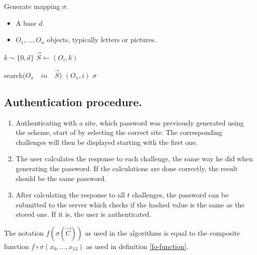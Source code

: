 \begin{algorithm}
    \caption{Generate mapping $\sigma$.}
    \begin{algorithmic}[1]
        \Require
            \Statex \begin{itemize}
                \item A base $d$.
                \item $O_1,\dots,O_n$ objects, typically letters or pictures.
            \end{itemize}
        
            \State $k \sim \{0,d\}$
            \State $\vec S \leftarrow (O_i,k)$
        \EndFor
        \Statex

            \State search($O_x\quad in\quad \vec S$)
            \State \Return $(O_x, i)$
        \EndFunction
        \Statex
        \State \Return $\sigma$
    \end{algorithmic}
    \label{gen-mapping}
\end{algorithm}
\subsection{Authentication procedure.}\label{subsec:auth}
\begin{enumerate}
    \item Authenticating with a site, which password was previously generated using the scheme, start of by selecting the correct site. The corresponding challenges will then be displayed starting with the first one.
    \item The user calculates the response to each challenge, the same way he did when generating the password. If the calculations are done correctly, the result should be the same password.
    \item After calculating the response to all $t$ challenges, the password can be submitted to the server which checks if the hashed value is the same as the stored one. If it is, the user is authenticated.
\end{enumerate}

\begin{remark}
    The notation $f(\sigma(\vec C))$ as used in the algorithms is equal to the composite function $f \circ \sigma(x_0,\dots,x_{13})$ as used in definition \ref{fo-function}.

\end{remark}

